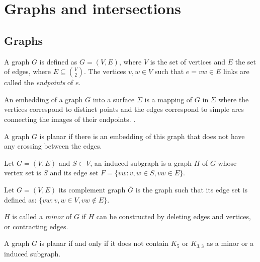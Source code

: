 \section{Graphs and intersections}
\label{sec:graphs}


\subsection{Graphs}

A graph $G$ is defined as $G = (V,E)$, where $V$ is the set of vertices and $E$ the set of
edges, where $E \subseteq \binom{V}{2}$. The vertices $v,w \in V$ such that $e = vw \in E$
links are called the \textit{endpoints} of $e$.

\begin{defn}
  An embedding of a graph $G$ into a surface $\Sigma$ is a mapping of $G$ in
  $\Sigma$ where the vertices correspond to distinct points and the edges
  correspond to simple arcs connecting the images of their endpoints.
  \cite{goyalGraphEmbeddingTechniques2017}.
\end{defn}

A graph $G$ is planar if there is an embedding of this graph that does not have
any crossing between the edges.

\begin{defn}
  Let $G = (V,E)$ and $S \subset V$, an induced subgraph is a graph $H$ of $G$ whose
  vertex set is $S$ and its edge set $F = \{vw : v,w \in S, vw \in E\}$.
\end{defn}

\begin{defn}
  Let $G = (V,E)$ its complement graph $\overline{G}$ is the graph such that its edge set
  is defined as: $\{vw: v,w\in V, vw\notin E\}$.
\end{defn}

\begin{defn}
  $H$ is called a \textit{minor} of $G$ if $H$ can be constructed by deleting edges and vertices,
  or contracting edges.
\end{defn}

\begin{theorem}[Kuratowski]
  A graph $G$ is planar if and only if it does not contain $K_5$ or $K_{3,3}$ as a minor or
  a induced subgraph.
\end{theorem}

